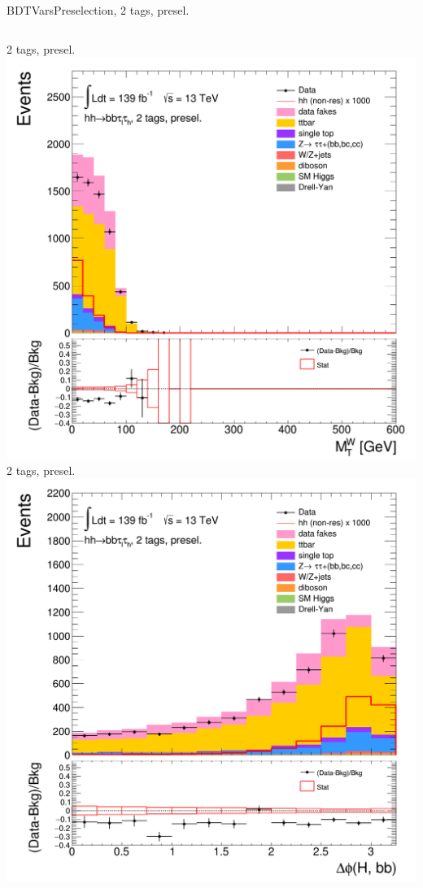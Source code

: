\begin{frame}{BDTVarsPreselection, 2 tags, presel.}
\begin{columns}[c]
    2 tags, presel.
    \centering\includegraphics[width=\textwidth]{C_2tag2pjet_0ptv_MtW}\\
    2 tags, presel.
    \centering\includegraphics[width=\textwidth]{C_2tag2pjet_0ptv_dPhiHBB}\\

\end{columns}
\end{frame}
